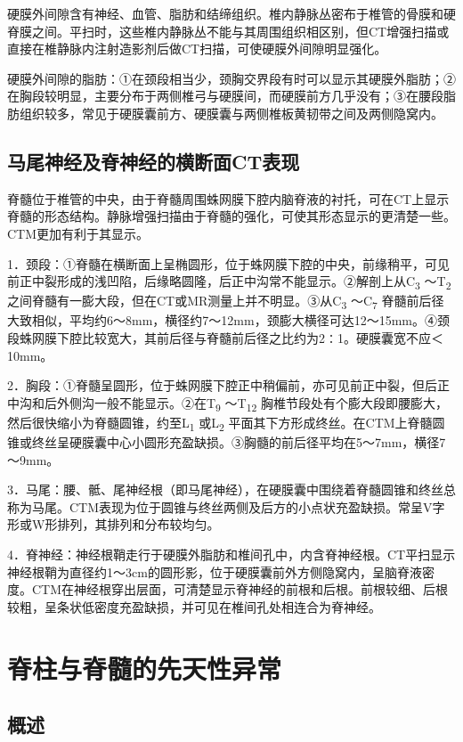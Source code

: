 硬膜外间隙含有神经、血管、脂肪和结缔组织。椎内静脉丛密布于椎管的骨膜和硬脊膜之间。平扫时，这些椎内静脉丛不能与其周围组织相区别，但CT增强扫描或直接在椎静脉内注射造影剂后做CT扫描，可使硬膜外间隙明显强化。

硬膜外间隙的脂肪：①在颈段相当少，颈胸交界段有时可以显示其硬膜外脂肪；②在胸段较明显，主要分布于两侧椎弓与硬膜间，而硬膜前方几乎没有；③在腰段脂肪组织较多，常见于硬膜囊前方、硬膜囊与两侧椎板黄韧带之间及两侧隐窝内。

\subsection{马尾神经及脊神经的横断面CT表现}

脊髓位于椎管的中央，由于脊髓周围蛛网膜下腔内脑脊液的衬托，可在CT上显示脊髓的形态结构。静脉增强扫描由于脊髓的强化，可使其形态显示的更清楚一些。CTM更加有利于其显示。

1．颈段：①脊髓在横断面上呈椭圆形，位于蛛网膜下腔的中央，前缘稍平，可见前正中裂形成的浅凹陷，后缘略圆隆，后正中沟常不能显示。②解剖上从C\textsubscript{3}
～T\textsubscript{2}
之间脊髓有一膨大段，但在CT或MR测量上并不明显。③从C\textsubscript{3}
～C\textsubscript{7}
脊髓前后径大致相似，平均约6～8mm，横径约7～12mm，颈膨大横径可达12～15mm。④颈段蛛网膜下腔比较宽大，其前后径与脊髓前后径之比约为2∶1。硬膜囊宽不应＜10mm。

2．胸段：①脊髓呈圆形，位于蛛网膜下腔正中稍偏前，亦可见前正中裂，但后正中沟和后外侧沟一般不能显示。②在T\textsubscript{9}
～T\textsubscript{12}
胸椎节段处有个膨大段即腰膨大，然后很快缩小为脊髓圆锥，约至L\textsubscript{1}
或L\textsubscript{2}
平面其下方形成终丝。在CTM上脊髓圆锥或终丝呈硬膜囊中心小圆形充盈缺损。③胸髓的前后径平均在5～7mm，横径7～9mm。

3．马尾：腰、骶、尾神经根（即马尾神经），在硬膜囊中围绕着脊髓圆锥和终丝总称为马尾。CTM表现为位于圆锥与终丝两侧及后方的小点状充盈缺损。常呈V字形或W形排列，其排列和分布较均匀。

4．脊神经：神经根鞘走行于硬膜外脂肪和椎间孔中，内含脊神经根。CT平扫显示神经根鞘为直径约1～3cm的圆形影，位于硬膜囊前外方侧隐窝内，呈脑脊液密度。CTM在神经根穿出层面，可清楚显示脊神经的前根和后根。前根较细、后根较粗，呈条状低密度充盈缺损，并可见在椎间孔处相连合为脊神经。

\section{脊柱与脊髓的先天性异常}

\subsection{概述}

